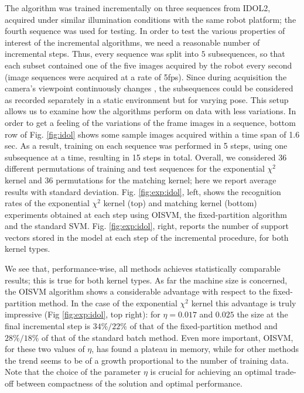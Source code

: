 The algorithm was trained incrementally on three sequences from IDOL2,
acquired under similar illumination conditions with the same robot
platform; the fourth sequence was used for testing. In order to test
the various properties of interest of the incremental algorithms, we
need a reasonable number of incremental steps.  Thus, every sequence
was split into $5$ subsequences, so that each subset contained one
of the five images acquired by the robot every second (image sequences
were acquired at a rate of 5fps). Since during acquisition the
camera's viewpoint continuously changes \cite{luo:icra07}, the
subsequences could be considered as recorded separately in a static
environment but for varying pose.  This setup allows us to examine how
the algorithms perform on data with less variations. In order to get a
feeling of the variations of the frame images in a sequence, bottom
row of Fig. \ref{fig:idol} shows some sample images acquired within a
time span of 1.6 sec. As a result, training
on each sequence was performed in 5 steps, using one subsequence at a
time, resulting in 15 steps in total. Overall, we considered 36
different permutations of training and test sequences for the
exponential $\chi^2$ kernel and 36 permutations for the matching
kernel; here we report average results with standard
deviation. Fig. \ref{fig:exp:idol}, left, shows the recognition rates
of the exponential $\chi^2$ kernel (top) and matching kernel (bottom)
experiments obtained at each step using OISVM, the fixed-partition
algorithm and the standard SVM. Fig. \ref{fig:exp:idol}, right,
reports the number of support vectors stored in the model at each step
of the incremental procedure, for both kernel types.

We see that, performance-wise, all methods achieves statistically
comparable results; this is true for both kernel types. As far the
machine size is concerned, the OISVM algorithm shows a considerable
advantage with respect to the fixed-partition method. In the case of the exponential
$\chi^{2}$ kernel this advantage is truly impressive (Fig
\ref{fig:exp:idol}, top right): for $\eta=0.017$ and $0.025$ the
size at the final incremental step is $34\%/22\%$ of that of the
fixed-partition method and $28\%/18\%$ of that of the
standard batch method. Even more important, OISVM, for these two
values of $\eta$, has found a plateau in memory, while for other
methods the trend seems to be of a growth proportional to the
number of training data. Note
that the choice of the parameter $\eta$ is crucial for achieving an
optimal trade-off between compactness of the solution and optimal
performance.

